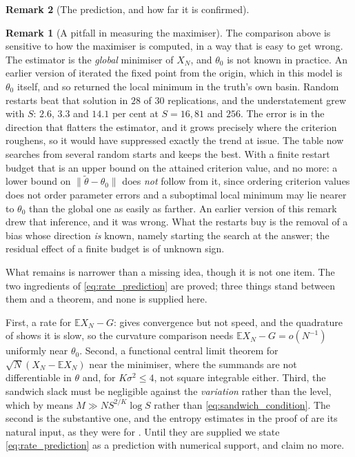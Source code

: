 \documentclass[11pt]{article}
\theoremstyle{definition}
\newtheorem{remark}[remark]{Remark}
\newcommand{\E}{\mathbb{E}}
\newcommand{\thetao}{\theta_0}
\begin{document}
\begin{remark}[The prediction, and how far it is confirmed]
\FloatBarrier

\begin{remark}[A pitfall in measuring the maximiser]\label{rem:search_bias}
The comparison above is sensitive to how the maximiser is computed, in a way that is easy to get wrong. The estimator is the \emph{global} minimiser of $X_N$, and $\thetao$ is not known in practice. An earlier version of  iterated the fixed point from the origin, which in this model is $\thetao$ itself, and so returned the local minimum in the truth's own basin. Random restarts beat that solution in $28$ of $30$ replications, and the understatement grew with $S$: $2.6$, $3.3$ and $14.1$ per cent at $S=16,81$ and $256$. The error is in the direction that flatters the estimator, and it grows precisely where the criterion roughens, so it would have suppressed exactly the trend at issue. The table now searches from several random starts and keeps the best. With a finite restart budget that is an upper bound on the attained criterion value, and no more: a lower bound on $\lVert\widetilde\theta-\thetao\rVert$ does \emph{not} follow from it, since ordering criterion values does not order parameter errors and a suboptimal local minimum may lie nearer to $\thetao$ than the global one as easily as farther. An earlier version of this remark drew that inference, and it was wrong. What the restarts buy is the removal of a bias whose direction \emph{is} known, namely starting the search at the answer; the residual effect of a finite budget is of unknown sign.
\end{remark}

What remains is narrower than a missing idea, though it is not one item. The two ingredients of \eqref{eq:rate_prediction} are proved; three things stand between them and a theorem, and none is supplied here.

First, a rate for $\E X_N-G$:  gives convergence but not speed, and the quadrature of  shows it is slow, so the curvature comparison needs $\E X_N-G=o(N^{-1})$ uniformly near $\thetao$. Second, a functional central limit theorem for $\sqrt N(X_N-\E X_N)$ near the minimiser, where the summands are not differentiable in $\theta$ and, for $K\sigma^2\le4$, not square integrable either. Third, the sandwich slack must be negligible against the \emph{variation} rather than the level, which by  means $M\gg NS^{2/K}\log S$ rather than \eqref{eq:sandwich_condition}. The second is the substantive one, and the entropy estimates in the proof of  are its natural input, as they were for . Until they are supplied we state \eqref{eq:rate_prediction} as a prediction with numerical support, and claim no more.


\end{remark}
\end{document}

